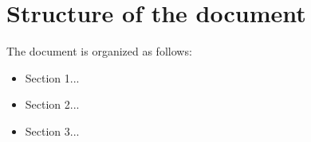 \section{Structure of the document}
\label{sec:structure}

The document is organized as follows:

\begin{itemize}
    \item Section 1...
    \item Section 2...
    \item Section 3...
\end{itemize}

